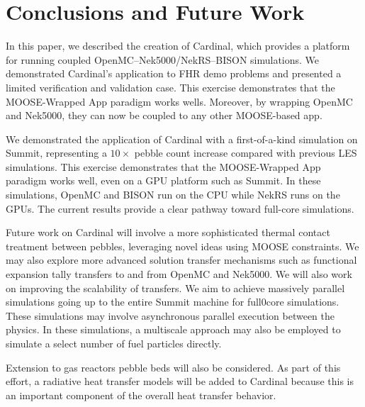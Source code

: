 
\section{Conclusions and Future Work}
\label{s:sum}


In this paper, we described the creation of Cardinal, which provides a platform for running coupled
OpenMC--Nek5000/NekRS--BISON simulations. We demonstrated Cardinal's application to FHR demo problems and
presented a limited verification and validation case. This exercise demonstrates that the MOOSE-Wrapped App
paradigm works wells. Moreover, by wrapping OpenMC and Nek5000, they can now be coupled to any other MOOSE-based app.

We demonstrated the application of Cardinal with a first-of-a-kind simulation on Summit, representing a $10\times$ pebble count increase compared with previous LES simulations. This exercise demonstrates that the MOOSE-Wrapped App paradigm works well, even on a GPU platform such as Summit. In these simulations, OpenMC and BISON run on the CPU while NekRS runs on the GPUs. The current results provide a clear pathway toward full-core simulations.

Future work on Cardinal will involve a more sophisticated thermal contact treatment between pebbles,
leveraging novel ideas using MOOSE constraints. We may also explore more advanced solution transfer
mechanisms such as functional expansion tally transfers to and from OpenMC and Nek5000. We
will also work on improving the scalability of transfers. We aim to achieve massively parallel simulations going up to the entire Summit machine for full0core simulations. These simulations may involve asynchronous parallel execution between the
physics. In these simulations, a multiscale approach may also be employed to simulate a select number of fuel particles directly.

Extension to gas reactors pebble beds will also be considered. As part of this effort, a radiative heat transfer models will be added to Cardinal because this is an important component of the overall heat transfer behavior.
